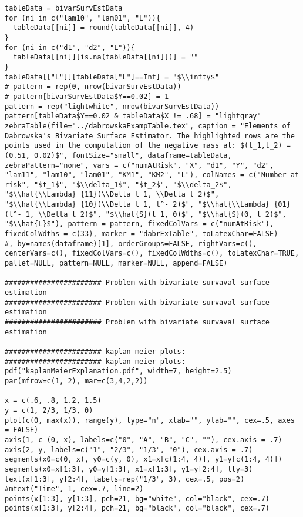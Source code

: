 \documentclass[]{article}
\begin{document}
{{\begin{verbatim}
tableData = bivarSurvEstData
for (ni in c("lam10", "lam01", "L")){
  tableData[[ni]] = round(tableData[[ni]], 4)
}
for (ni in c("d1", "d2", "L")){
  tableData[[ni]][is.na(tableData[[ni]])] = ""
}
tableData[["L"]][tableData["L"]==Inf] = "$\\infty$"
# pattern = rep(0, nrow(bivarSurvEstData))
# pattern[bivarSurvEstData$Y==0.02] = 1
pattern = rep("lightwhite", nrow(bivarSurvEstData))
pattern[tableData$Y==0.02 & tableData$X != .68] = "lightgray"
zebraTable(file="../dabrowskaExampTable.tex", caption = "Elements of Dabrowska's Bivariate Surface Estimator. The highlighted rows are the points used in the computation of the negative mass at: $(t_1,t_2) = (0.51, 0.02)$", fontSize="small", dataframe=tableData, zebraPattern="none", vars = c("numAtRisk", "X", "d1", "Y", "d2", "lam11", "lam10", "lam01", "KM1", "KM2", "L"), colNames = c("Number at risk", "$t_1$", "$\\delta_1$", "$t_2$", "$\\delta_2$", "$\\hat{\\Lambda}_{11}(\\Delta t_1, \\Delta t_2)$", "$\\hat{\\Lambda}_{10}(\\Delta t_1, t^-_2)$", "$\\hat{\\Lambda}_{01}(t^-_1, \\Delta t_2)$", "$\\hat{S}(t_1, 0)$", "$\\hat{S}(0, t_2)$", "$\\hat{L}$"), pattern = pattern, fixedColVars = c("numAtRisk"), fixedColWdths = c(33), marker = "dabrExTable", toLatexChar=FALSE)
#, by=names(dataframe)[1], orderGroups=FALSE, rightVars=c(), centerVars=c(), fixedColVars=c(), fixedColWdths=c(), toLatexChar=TRUE, pallet=NULL, pattern=NULL, marker=NULL, append=FALSE)

####################### Problem with bivariate survaval surface estimation
####################### Problem with bivariate survaval surface estimation
####################### Problem with bivariate survaval surface estimation

####################### kaplan-meier plots:
####################### kaplan-meier plots:
pdf("kaplanMeierExplanation.pdf", width=7, height=2.5)
par(mfrow=c(1, 2), mar=c(3,4,2,2))

x = c(.6, .8, 1.2, 1.5)
y = c(1, 2/3, 1/3, 0)
plot(c(0, max(x)), range(y), type="n", xlab="", ylab="", cex=.5, axes = FALSE)
axis(1, c (0, x), labels=c("0", "A", "B", "C", ""), cex.axis = .7)
axis(2, y, labels=c("1", "2/3", "1/3", "0"), cex.axis = .7)
segments(x0=c(0, x), y0=c(y, 0), x1=x[c(1:4, 4)], y1=y[c(1:4, 4)])
segments(x0=x[1:3], y0=y[1:3], x1=x[1:3], y1=y[2:4], lty=3)
text(x[1:3], y[2:4], labels=rep("1/3", 3), cex=.5, pos=2)
#mtext("Time", 1, cex=.7, line=2)
points(x[1:3], y[1:3], pch=21, bg="white", col="black", cex=.7)
points(x[1:3], y[2:4], pch=21, bg="black", col="black", cex=.7)


\end{verbatim}}}
\end{document}
